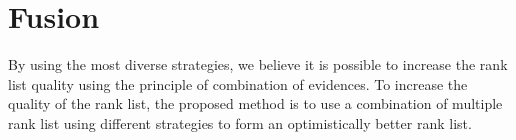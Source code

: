 \section{Fusion \label{sec:fusion}}

By using the most diverse strategies, we believe it is possible to increase the rank list quality using the principle of combination of evidences.
To increase the quality of the rank list, the proposed method is to use a combination of multiple rank list using different strategies to form an optimistically better rank list.



